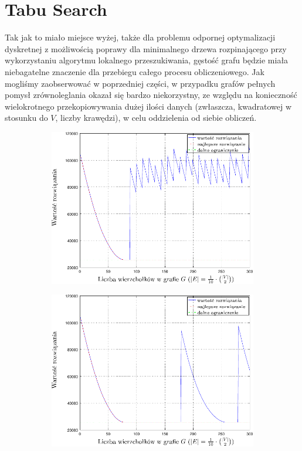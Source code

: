 \section{Tabu Search}

Tak jak to miało miejsce wyżej, także dla problemu odpornej optymalizacji dyskretnej z możliwością poprawy dla minimalnego drzewa rozpinającego przy wykorzystaniu algorytmu lokalnego przeszukiwania, gęstość grafu będzie miała niebagatelne znaczenie dla przebiegu całego procesu obliczeniowego. Jak mogliśmy zaobserwować w poprzedniej części, w przypadku grafów pełnych pomysł zrównoleglania okazał się bardzo niekorzystny, ze względu na konieczność wielokrotnego przekopiowywania dużej ilości danych (zwłaszcza, kwadratowej w stosunku do $V$, liczby krawędzi), w celu oddzielenia od siebie obliczeń.

\begin{figure}[!htbp]
	\null\hfill
	\begin{subfigure}[b]{0.45\textwidth}
		\includegraphics[width=\textwidth]{Chapter_VI/RRIMST1-example/RRIMST1_psfrag}
		\caption{}
		\label{fig:rrimst1:a}
	\end{subfigure}
	\hfill
	\begin{subfigure}[b]{0.45\textwidth}
		\includegraphics[width=\textwidth]{Chapter_VI/RRIMST2-example/RRIMST2_psfrag}

\end{subfigure}
\end{figure}
